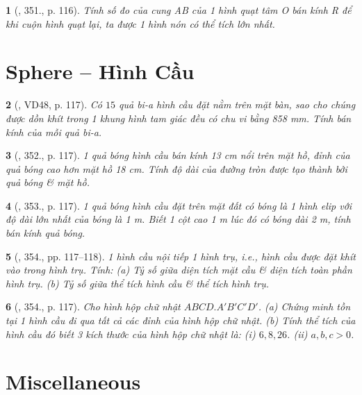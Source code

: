 \documentclass{article}
\newtheorem{baitoan}{}
\begin{document}
\begin{baitoan}[\cite{Binh_Toan_9_tap_2}, 351., p. 116]
	Tính số đo của cung AB của 1 hình quạt tâm O bán kính R để khi cuộn hình quạt lại, ta được 1 hình nón có thể tích lớn nhất.
\end{baitoan}


\section{Sphere -- Hình Cầu}

\begin{baitoan}[\cite{Binh_Toan_9_tap_2}, VD48, p. 117]
	Có $15$ quả bi-a hình cầu đặt nằm trên mặt bàn, sao cho chúng được dồn khít trong 1 khung hình tam giác đều có chu vi bằng {\rm858 mm}. Tính bán kính của mỗi quả bi-a.
\end{baitoan}

\begin{baitoan}[\cite{Binh_Toan_9_tap_2}, 352., p. 117]
	1 quả bóng hình cầu bán kính {\rm13 cm} nổi trên mặt hồ, đỉnh của quả bóng cao hơn mặt hồ {\rm18 cm}. Tính độ dài của đường tròn được tạo thành bởi quả bóng \& mặt hồ.
\end{baitoan}

\begin{baitoan}[\cite{Binh_Toan_9_tap_2}, 353., p. 117]
	1 quả bóng hình cầu đặt trên mặt đất có bóng là 1 hình elip với độ dài lớn nhất của bóng là {\rm1 m}. Biết 1 cột cao {\rm1 m} lúc đó có bóng dài {\rm2 m}, tính bán kính quả bóng.
\end{baitoan}

\begin{baitoan}[\cite{Binh_Toan_9_tap_2}, 354., pp. 117--118]
	1 hình cầu nội tiếp 1 hình trụ, i.e., hình cầu được đặt khít vào trong hình trụ. Tính: (a) Tỷ số giữa diện tích mặt cầu \& diện tích toàn phần hình trụ. (b) Tỷ số giữa thể tích hình cầu \& thể tích hình trụ.
\end{baitoan}

\begin{baitoan}[\cite{Binh_Toan_9_tap_2}, 354., p. 117]
	Cho hình hộp chữ nhật $ABCD.A'B'C'D'$. (a) Chứng minh tồn tại 1 hình cầu đi qua tất cả các đỉnh của hình hộp chữ nhật. (b) Tính thể tích của hình cầu đó biết 3 kích thước của hình hộp chữ nhật là: (i) $6,8,26$. (ii) $a,b,c > 0$.
\end{baitoan}


\section{Miscellaneous}


\printbibliography[heading=bibintoc]
	
\end{document}
